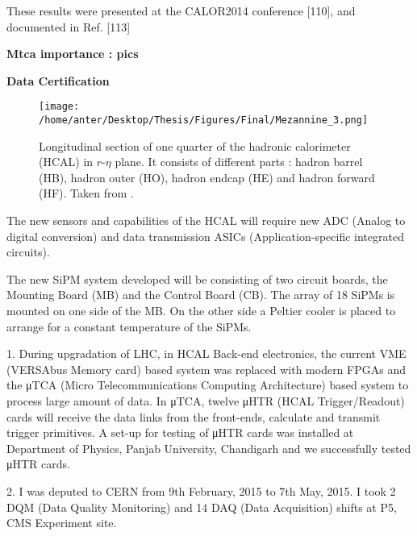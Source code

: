 These results were presented at the CALOR2014
conference [110], and documented in Ref. [113]

\cite{Kunsken:2015zla}
{\bf Mtca importance : pics}

{\bf Data Certification}




\begin{figure}[!h]
\begin{center}
\vspace*{3mm} 
\hspace*{-5mm}
\texttt{[image: /home/anter/Desktop/Thesis/Figures/Final/Mezannine\_3.png]}\\
\vspace*{4mm}
\caption[Longitudinal section of one quarter of the hadronic calorimeter (HCAL) in $r$-$\eta$ plane.]{Longitudinal section of one quarter of the hadronic calorimeter (HCAL) in $r$-$\eta$ plane. It consists of different parts : hadron barrel (HB), hadron outer (HO), hadron endcap (HE) and hadron forward (HF). Taken from \cite{Chatrchyan:2008aa}.}
\label{fig:mez}
\end{center}
\end{figure}

The new sensors and capabilities of
the HCAL will require new ADC (Analog to digital conversion) and
data transmission ASICs (Application-specific integrated circuits).


 The new SiPM system developed will be consisting of two circuit boards,
the Mounting Board (MB) and the Control Board (CB). The array
of 18 SiPMs is mounted on one side of the MB. On the other side a
Peltier cooler is placed to arrange for a constant temperature of the
SiPMs.


\cite{DN}


1. During upgradation of LHC, in HCAL Back-end electronics, the current VME (VERSAbus Memory card) based system was replaced with modern FPGAs and the μTCA (Micro Telecommunications Computing Architecture) based system to process large amount of data. In μTCA, twelve μHTR (HCAL Trigger/Readout) cards will receive the data links from the front-ends, calculate and transmit trigger primitives. A set-up for testing of μHTR cards was installed at Department of Physics, Panjab University, Chandigarh and we successfully tested μHTR cards. 

2. I was deputed to CERN from 9th February, 2015 to 7th May, 2015. I took 2 DQM (Data Quality Monitoring) and 14 DAQ (Data Acquisition) shifts at P5, CMS Experiment site.

